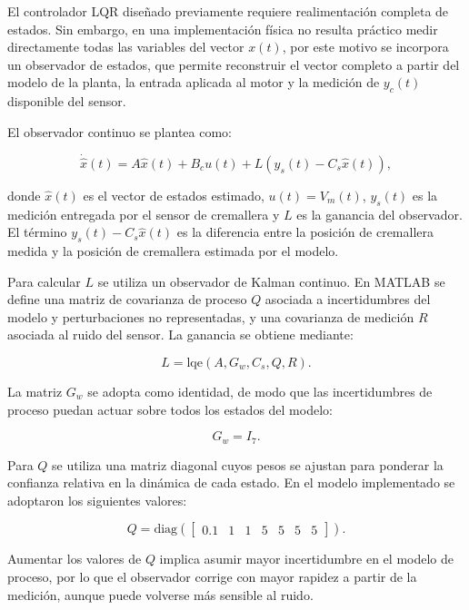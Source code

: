 \documentclass{article}
\begin{document}
El controlador LQR diseñado previamente requiere realimentación completa de estados. Sin embargo, en una implementación física no resulta práctico medir directamente todas las variables del vector $x(t)$, por este motivo se incorpora un observador de estados, que permite reconstruir el vector completo a partir del modelo de la planta, la entrada aplicada al motor y la medición de $y_c(t)$ disponible del sensor.

El observador continuo se plantea como:

\begin{equation}
\dot{\hat{x}}(t)
=
A\hat{x}(t)+B_cu(t)+L\left(y_s(t)-C_s\hat{x}(t)\right),
\end{equation}

donde $\hat{x}(t)$ es el vector de estados estimado, $u(t)=V_m(t)$, $y_s(t)$ es la medición entregada por el sensor de cremallera y $L$ es la ganancia del observador. El término $y_s(t)-C_s\hat{x}(t)$ es la diferencia entre la posición de cremallera medida y la posición de cremallera estimada por el modelo.

Para calcular $L$ se utiliza un observador de Kalman continuo. En MATLAB se define una matriz de covarianza de proceso $Q$ asociada a incertidumbres del modelo y perturbaciones no representadas, y una covarianza de medición $R$ asociada al ruido del sensor. La ganancia se obtiene mediante:

\begin{equation}
L=\mathrm{lqe}(A,G_w,C_s,Q,R).
\end{equation}

La matriz $G_w$ se adopta como identidad, de modo que las incertidumbres de proceso puedan actuar sobre todos los estados del modelo:

\begin{equation}
G_w=I_7.
\end{equation}

Para $Q$ se utiliza una matriz diagonal cuyos pesos se ajustan para ponderar la confianza relativa en la dinámica de cada estado. En el modelo implementado se adoptaron los siguientes valores:

\begin{equation}
Q=\mathrm{diag}\left(
\begin{bmatrix}
0.1 & 1 & 1 & 5 & 5 & 5 & 5
\end{bmatrix}
\right).
\end{equation}

Aumentar los valores de $Q$ implica asumir mayor incertidumbre en el modelo de proceso, por lo que el observador corrige con mayor rapidez a partir de la medición, aunque puede volverse más sensible al ruido.
\end{document}
